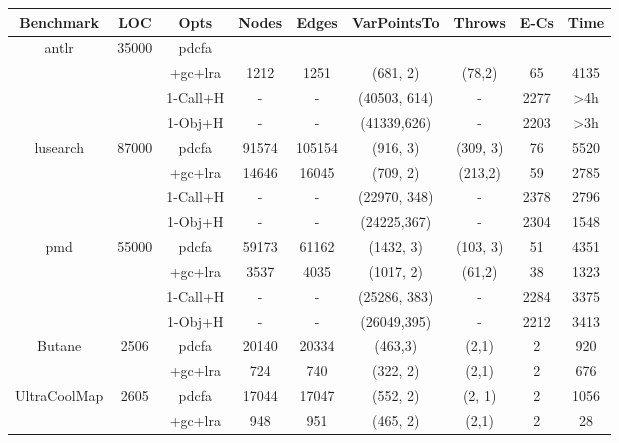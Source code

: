 \begin{table}
{\footnotesize
    \begin{tabular}{| c| c | c| c | c | c | c | c | c |}
\hline
\textbf{Benchmark} & \textbf{LOC} & \textbf{Opts} & \textbf{Nodes} & \textbf{Edges} &  \textbf{VarPointsTo} & \textbf{Throws} & \textbf{E-Cs} & \textbf{Time} \\ \hline 
   antlr &   \multirow{4}{*}{35000} &pdcfa &   &    &   &     &    &   
     \\ & & +gc+lra & 1212  & 1251  &   (681, 2)& (78,2) &  65 & 4135 \\
      & & 1-Call+H & -  & -  &   (40503, 614)& - &  2277 & \textgreater4h \\
      & & 1-Obj+H & -  & -  &   (41339,626) & - &  2203 & \textgreater3h \\
     \hline
lusearch &  \multirow{4}{*}{ 87000}& pdcfa & 91574  & 105154  &  (916, 3) &  (309, 3)  & 76 & 5520 
          \\ && +gc+lra & 14646  & 16045  &   (709, 2)& (213,2) & 59 & 2785 \\
            & & 1-Call+H & -  & -  &   (22970, 348)& - &  2378 &  2796 \\
                & & 1-Obj+H & -  & -  &   (24225,367) & - &  2304 & 1548 \\
          \hline
pmd & \multirow{4}{*}{55000} &pdcfa & 59173  & 61162  &  (1432, 3) &  (103, 3)  & 51  & 4351
         \\ && +gc+lra & 3537  & 4035  &   (1017, 2)& (61,2) & 38& 1323 \\
          & & 1-Call+H & -  & -  &   (25286, 383)& - &  2284 &  3375 \\
          & & 1-Obj+H & -  & -  &   (26049,395) & - &  2212 & 3413 \\
         \hline
          \hline
Butane &  \multirow{2}{*}{2506}&pdcfa & 20140  & 20334 &  (463,3) &  (2,1)  &  2 &   920
                     \\ &&+gc+lra & 724  & 740  &   (322, 2)& (2,1) & 2 & 676 \\
                     \hline
UltraCoolMap & \multirow{2}{*}{2605} &pdcfa & 17044  & 17047  &  (552, 2) &  (2, 1)  & 2  & 1056 
                                \\ &&+gc+lra & 948  & 951  &   (465, 2)& (2,1) & 2 & 28 \\
                                \hline
        

\end{tabular}}
\end{table}
